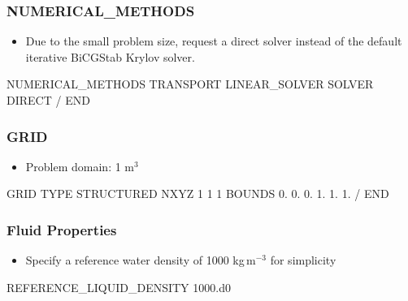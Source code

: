 \documentclass{beamer}
\begin{document}
\begin{frame}[fragile]\frametitle{NUMERICAL\_METHODS}

\begin{itemize}
\item Due to the small problem size, request a direct solver instead of the default iterative BiCGStab Krylov solver.
\end{itemize}

\begin{semiverbatim}

NUMERICAL_METHODS TRANSPORT
  LINEAR_SOLVER
    SOLVER DIRECT
  /
END

\end{semiverbatim}

\end{frame}

\begin{frame}\frametitle{GRID}

\begin{itemize}
  \item Problem domain: 1 m$^3$
\end{itemize}

\begin{semiverbatim}

GRID
  TYPE STRUCTURED
  NXYZ 1 1 1
  BOUNDS
    0. 0. 0.
    1. 1. 1.
  /
END
\end{semiverbatim}

\end{frame}

\begin{frame}\frametitle{Fluid Properties}

\begin{itemize}
  \item Specify a reference water density of 1000 kg\,m$^{-3}$ for simplicity
\end{itemize}

\begin{semiverbatim}




REFERENCE_LIQUID_DENSITY 1000.d0

\end{semiverbatim}

\end{frame}
\end{document}
